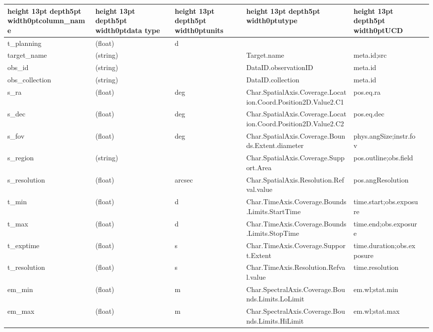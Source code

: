 \documentclass[11pt,a4paper]{ivoa}
\begin{document}
\begin{landscape}
\begin{table}
\def\hlstrut{\vrule height 13pt depth5pt width0pt}
\begin{tabular}{ |l|l|l|l|l|l| }
\hline
\hlstrut\textbf{column\_name} &
\hlstrut\textbf{data type} &
\hlstrut\textbf{units} &
\hlstrut\textbf{utype} &
\hlstrut\textbf{UCD} \\
\hline
t\_planning &
(float) &
d &
&
\\
\hline
target\_name &
(string) &
&
Target.name &
meta.id;src \\
\hline
obs\_id &
(string) &
&
DataID.observationID &
meta.id \\
\hline
obs\_collection &
(string) &
&
DataID.collection &
meta.id \\
\hline
s\_ra &
(float) &
deg &
Char.SpatialAxis.Coverage.Location.Coord.Position2D.Value2.C1 &
pos.eq.ra \\
\hline
s\_dec &
(float) &
deg &
Char.SpatialAxis.Coverage.Location.Coord.Position2D.Value2.C2 &
pos.eq.dec \\
\hline
s\_fov &
(float) &
deg &
Char.SpatialAxis.Coverage.Bounds.Extent.diameter &
phys.angSize;instr.fov \\
\hline
s\_region &
(string) &
&
Char.SpatialAxis.Coverage.Support.Area &
pos.outline;obs.field \\
\hline
s\_resolution &
(float) &
arcsec &
Char.SpatialAxis.Resolution.Refval.value &
pos.angResolution \\
\hline
t\_min &
(float) &
d &
Char.TimeAxis.Coverage.Bounds.Limits.StartTime &
time.start;obs.exposure \\
\hline
t\_max &
(float) &
d &
Char.TimeAxis.Coverage.Bounds.Limits.StopTime &
time.end;obs.exposure \\
\hline
t\_exptime &
(float) &
s &
Char.TimeAxis.Coverage.Support.Extent &
time.duration;obs.exposure \\
\hline
t\_resolution &
(float) &
s &
Char.TimeAxis.Resolution.Refval.value &
time.resolution \\
\hline
em\_min &
(float) &
m &
Char.SpectralAxis.Coverage.Bounds.Limits.LoLimit &
em.wl;stat.min \\
\hline
em\_max &
(float) &
m &
Char.SpectralAxis.Coverage.Bounds.Limits.HiLimit &
em.wl;stat.max \\

\end{tabular}
\end{table}
\end{landscape}
\end{document}
